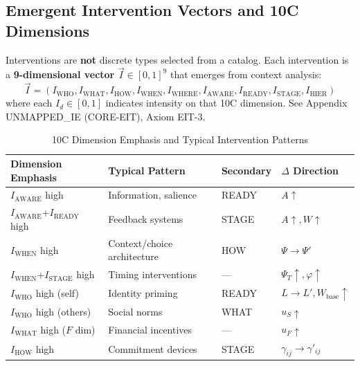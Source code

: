 \subsection{Emergent Intervention Vectors and 10C Dimensions}

\begin{tcolorbox}[colback=blue!5!white, colframe=blue!75!black, title=\textbf{Key Insight: Interventions Emerge from Continuous 10C Space}]
Interventions are \textbf{not} discrete types selected from a catalog. Each intervention is a \textbf{9-dimensional vector} $\vec{I} \in [0,1]^9$ that emerges from context analysis:
\begin{equation}
\vec{I} = (I_{\text{WHO}}, I_{\text{WHAT}}, I_{\text{HOW}}, I_{\text{WHEN}}, I_{\text{WHERE}}, I_{\text{AWARE}}, I_{\text{READY}}, I_{\text{STAGE}}, I_{\text{HIER}})
\end{equation}
where each $I_d \in [0,1]$ indicates intensity on that 10C dimension. See Appendix UNMAPPED_IE (CORE-EIT), Axiom EIT-3.
\end{tcolorbox}

\begin{table}[htbp]
\centering
\caption{10C Dimension Emphasis and Typical Intervention Patterns}
\label{tab:hhh-type-to-9c}
\renewcommand{\arraystretch}{1.3}
\small
\begin{tabular}{@{}llll@{}}
\toprule
\textbf{Dimension Emphasis} & \textbf{Typical Pattern} & \textbf{Secondary} & \textbf{$\Delta$ Direction} \\
\midrule
$I_{\text{AWARE}}$ high & Information, salience & READY & $A \uparrow$ \\
$I_{\text{AWARE}}$+$I_{\text{READY}}$ high & Feedback systems & STAGE & $A \uparrow, W \uparrow$ \\
$I_{\text{WHEN}}$ high & Context/choice architecture & HOW & $\Psi \rightarrow \Psi'$ \\
$I_{\text{WHEN}}$+$I_{\text{STAGE}}$ high & Timing interventions & --- & $\Psi_T \uparrow, \varphi \uparrow$ \\
$I_{\text{WHO}}$ high (self) & Identity priming & READY & $L \rightarrow L', W_{\text{base}} \uparrow$ \\
$I_{\text{WHO}}$ high (others) & Social norms & WHAT & $u_S \uparrow$ \\
$I_{\text{WHAT}}$ high ($F$ dim) & Financial incentives & --- & $u_F \uparrow$ \\
$I_{\text{HOW}}$ high & Commitment devices & STAGE & $\gamma_{ij} \rightarrow \gamma'_{ij}$ \\
\bottomrule
\end{tabular}
\end{table}

